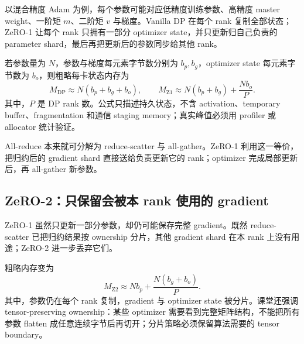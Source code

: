 以混合精度 Adam 为例，每个参数可能对应低精度训练参数、高精度 master weight、一阶矩 $m$、二阶矩 $v$ 与梯度。Vanilla DP 在每个 rank 复制全部状态；ZeRO-1 让每个 rank 只拥有一部分 optimizer state，并只更新归自己负责的 parameter shard，最后再把更新后的参数同步给其他 rank。


若参数量为 $N$，参数与梯度每元素字节数分别为 $b_p,b_g$，optimizer state 每元素字节数为 $b_o$，则粗略每卡状态内存为
\[
M_{\mathrm{DP}}\approx N(b_p+b_g+b_o),
\qquad
M_{\mathrm{Z1}}\approx N(b_p+b_g)+\frac{Nb_o}{P}.
\]
其中，$P$ 是 DP rank 数。公式只描述持久状态，不含 activation、temporary buffer、fragmentation 和通信 staging memory；真实峰值必须用 profiler 或 allocator 统计验证。



All-reduce 本来就可分解为 reduce-scatter 与 all-gather。ZeRO-1 利用这一等价，把归约后的 gradient shard 直接送给负责更新它的 rank；optimizer 完成局部更新后，再 all-gather 新参数。


\subsection{ZeRO-2：只保留会被本 rank 使用的 gradient}

ZeRO-1 虽然只更新一部分参数，却仍可能保存完整 gradient。既然 reduce-scatter 已把归约结果按 ownership 分片，其他 gradient shard 在本 rank 上没有用途；ZeRO-2 进一步丢弃它们。



粗略内存变为
\[
M_{\mathrm{Z2}}\approx Nb_p+\frac{N(b_g+b_o)}{P}.
\]
其中，参数仍在每个 rank 复制，gradient 与 optimizer state 被分片。课堂还强调 tensor-preserving ownership：某些 optimizer 需要看到完整矩阵结构，不能把所有参数 flatten 成任意连续字节后再切开；分片策略必须保留算法需要的 tensor boundary。


